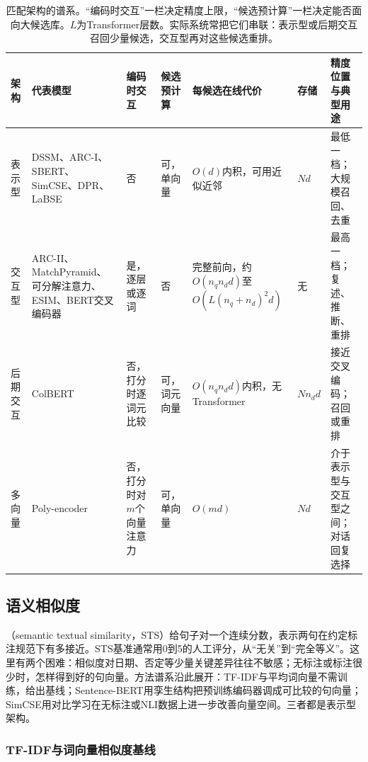 \begin{table}[htbp]
  \centering
  \small
  \begin{tabularx}{\linewidth}{@{}>{\raggedright\arraybackslash}p{12mm}
    >{\raggedright\arraybackslash}p{30mm}>{\raggedright\arraybackslash}p{19mm}
    >{\raggedright\arraybackslash}p{15mm}>{\raggedright\arraybackslash}p{30mm}
    >{\raggedright\arraybackslash}p{10mm}>{\raggedright\arraybackslash}X@{}}
    \toprule
    架构 & 代表模型 & 编码时交互 & 候选预计算 & 每候选在线代价 & 存储 & 精度位置与典型用途 \\
    \midrule
    表示型 & DSSM、ARC-I、SBERT、SimCSE、DPR、LaBSE & 否 & 可，单向量 & $O(d)$内积，可用近似近邻 & $Nd$ & 最低一档；大规模召回、去重 \\
    交互型 & ARC-II、MatchPyramid、可分解注意力、ESIM、BERT交叉编码器 & 是，逐层或逐词 & 否 & 完整前向，约$O(n_qn_dd)$至$O(L(n_q+n_d)^2d)$ & 无 & 最高一档；复述、推断、重排 \\
    后期交互 & ColBERT & 否，打分时逐词元比较 & 可，词元向量 & $O(n_qn_dd)$内积，无Transformer & $Nn_dd$ & 接近交叉编码；召回或重排 \\
    多向量 & Poly-encoder & 否，打分时对$m$个向量注意力 & 可，单向量 & $O(md)$ & $Nd$ & 介于表示型与交互型之间；对话回复选择 \\
    \bottomrule
  \end{tabularx}
  \caption{匹配架构的谱系。“编码时交互”一栏决定精度上限，“候选预计算”一栏决定能否面向大候选库。$L$为Transformer层数。实际系统常把它们串联：表示型或后期交互召回少量候选，交互型再对这些候选重排。}
  \label{tab:nlp-classification-matching-architectures}
\end{table}

\FloatBarrier
\subsection{语义相似度}
\label{sec:nlp-classification-similarity}

（semantic textual similarity，STS）给句子对一个连续分数，表示两句在约定标注规范下有多接近。STS基准通常用0到5的人工评分，从“无关”到“完全等义”。这里有两个困难：相似度对日期、否定等少量关键差异往往不敏感；无标注或标注很少时，怎样得到好的句向量。方法谱系沿此展开：TF-IDF与平均词向量不需训练，给出基线；Sentence-BERT用孪生结构把预训练编码器调成可比较的句向量；SimCSE用对比学习在无标注或NLI数据上进一步改善向量空间。三者都是表示型架构。

\subsubsection{TF-IDF与词向量相似度基线}
\label{sec:nlp-classification-similarity-baseline}

